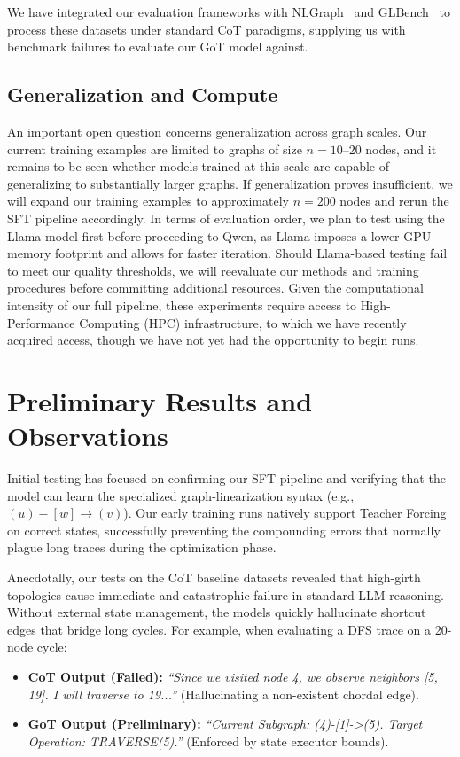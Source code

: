 \documentclass[sigplan,screen]{acmart}
\begin{document}
We have integrated our evaluation frameworks with NLGraph~\cite{nlgraph2024} and GLBench~\cite{glbench2024} to process these datasets under standard CoT paradigms, supplying us with benchmark failures to evaluate our GoT model against.

\subsection{Generalization and Compute}

An important open question concerns generalization across graph scales. Our current training examples are limited to graphs of size $n = 10$--$20$ nodes, and it remains to be seen whether models trained at this scale are capable of generalizing to substantially larger graphs. If generalization proves insufficient, we will expand our training examples to approximately $n = 200$ nodes and rerun the SFT pipeline accordingly. In terms of evaluation order, we plan to test using the Llama model first before proceeding to Qwen, as Llama imposes a lower GPU memory footprint and allows for faster iteration. Should Llama-based testing fail to meet our quality thresholds, we will reevaluate our methods and training procedures before committing additional resources. Given the computational intensity of our full pipeline, these experiments require access to High-Performance Computing (HPC) infrastructure, to which we have recently acquired access, though we have not yet had the opportunity to begin runs.

\section{Preliminary Results and Observations}

Initial testing has focused on confirming our SFT pipeline and verifying that the model can learn the specialized graph-linearization syntax (e.g., $(u)-[w]\rightarrow(v)$). Our early training runs natively support Teacher Forcing on correct states, successfully preventing the compounding errors that normally plague long traces during the optimization phase.

Anecdotally, our tests on the CoT baseline datasets revealed that high-girth topologies cause immediate and catastrophic failure in standard LLM reasoning. Without external state management, the models quickly hallucinate shortcut edges that bridge long cycles. For example, when evaluating a DFS trace on a 20-node cycle:
\begin{itemize}
    \item \textbf{CoT Output (Failed):} \textit{``Since we visited node 4, we observe neighbors [5, 19]. I will traverse to 19...''} (Hallucinating a non-existent chordal edge).
    \item \textbf{GoT Output (Preliminary):} \textit{``Current Subgraph: (4)-[1]->(5). Target Operation: TRAVERSE(5).''} (Enforced by state executor bounds).
\end{itemize}
\end{document}
